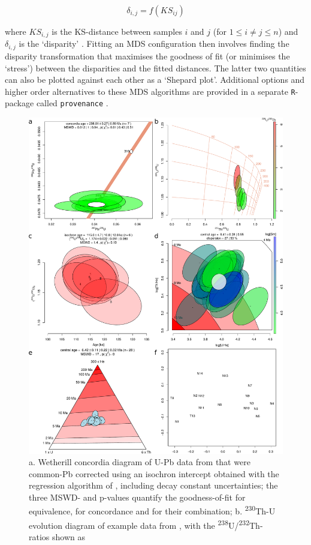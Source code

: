 \documentclass{article}
\begin{document}
\[
\delta_{i,j} = f(KS_{ij})
\]

\noindent where $KS_{i,j}$ is the KS-distance between samples $i$ and
$j$ (for $1 \leq i \neq j \leq n$) and $\delta_{i,j}$ is the
`disparity' \citep{kruskal1978}.  Fitting an MDS configuration then
involves finding the disparity transformation that maximises the
goodness of fit (or minimises the `stress') between the disparities
and the fitted distances. The latter two quantities can also be
plotted against each other as a `Shepard plot'. Additional options and
higher order alternatives to these MDS algorithms are provided in a
separate \texttt{R}-package called \texttt{provenance}
\citep{vermeesch2016a}.

\begin{figure}[p]
  \centering
  \includegraphics[width=.75\textwidth]{fig2.pdf}
  \caption{ a. Wetherill concordia diagram of U-Pb data from
    \citet{ludwig2003} that were common-Pb corrected using an isochron
    intercept obtained with the regression algorithm of
    \citet{ludwig1998}, including decay constant uncertainties; the
    three MSWD- and p-values quantify the goodness-of-fit for
    equivalence, for concordance and for their combination;
    b. \textsuperscript{230}Th-U evolution diagram of example data
    from \citet{ludwig1994}, with the
    \textsuperscript{238}U/\textsuperscript{232}Th-ratios shown as
}
\end{figure}
\end{document}
